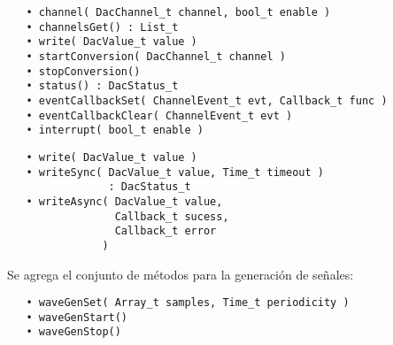 \begin{verbatim}
   • channel( DacChannel_t channel, bool_t enable )
   • channelsGet() : List_t
   • write( DacValue_t value )
   • startConversion( DacChannel_t channel )
   • stopConversion()
   • status() : DacStatus_t
   • eventCallbackSet( ChannelEvent_t evt, Callback_t func )
   • eventCallbackClear( ChannelEvent_t evt )
   • interrupt( bool_t enable )
\end{verbatim}


\begin{verbatim}
   • write( DacValue_t value )
   • writeSync( DacValue_t value, Time_t timeout ) 
                : DacStatus_t
   • writeAsync( DacValue_t value, 
                 Callback_t sucess, 
                 Callback_t error 
               )
\end{verbatim}

Se agrega el conjunto de métodos para la generación de señales:

\begin{verbatim}
   • waveGenSet( Array_t samples, Time_t periodicity )
   • waveGenStart()
   • waveGenStop()
\end{verbatim}
